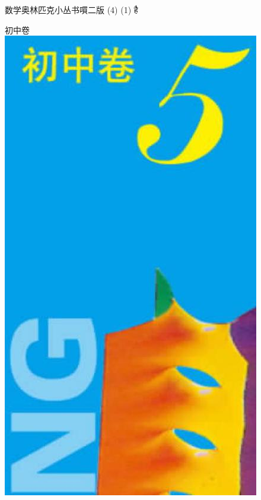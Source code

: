 \documentclass[10pt]{article}
\begin{document}
数学奥林匹克小丛书嘪二版 (4) (1) है

初中卷\\
\includegraphics[max width=\textwidth, center]{2024_10_30_66b8e5e701da2093c133g-001}\\
\end{document}
